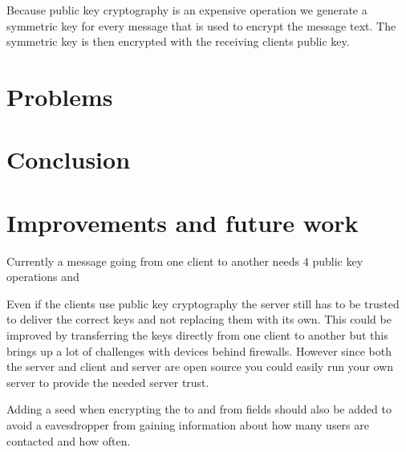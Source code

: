 \documentclass[twocolumn,11pt]{IEEEtran}
\begin{document}
 Because public key cryptography is an expensive operation we generate a symmetric key for every message that is used to encrypt the message text. The symmetric key is then encrypted with the receiving clients public key. 

\section{Problems}
\label{sec:problems}


\section {Conclusion}
\label{sec:conclusion}



\section {Improvements and future work}
\label{sec:improve}
Currently a message going from one client to another needs 4 public key operations and 

Even if the clients use public key cryptography the server still has to be trusted to deliver the correct keys and not replacing them with its own. This could be improved by transferring the keys directly from one client to another but this brings up a lot of challenges with devices behind firewalls. However since both the server and client and server are open source you could easily run your own server to provide the needed server trust.

Adding a seed when encrypting the to and from fields should also be added to avoid a eavesdropper from gaining information about how many users are contacted and how often. 

%
%
\end{document}
